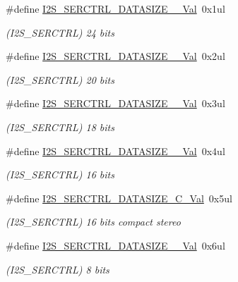 \begin{DoxyCompactItemize}
\#define \mbox{\hyperlink{group___s_a_m_d21___i2_s_ga8e42011d7f151e6e19ebdacf35bdfed1}{I2\+S\+\_\+\+S\+E\+R\+C\+T\+R\+L\+\_\+\+D\+A\+T\+A\+S\+I\+Z\+E\+\_\+\_\+\+Val}}~0x1ul
\begin{DoxyCompactList}\small\item\em (I2\+S\+\_\+\+S\+E\+R\+C\+T\+RL) 24 bits \end{DoxyCompactList}\item 
\#define \mbox{\hyperlink{group___s_a_m_d21___i2_s_ga0b83fc41259df61dc2a04cd386d4afcb}{I2\+S\+\_\+\+S\+E\+R\+C\+T\+R\+L\+\_\+\+D\+A\+T\+A\+S\+I\+Z\+E\+\_\+\_\+\+Val}}~0x2ul
\begin{DoxyCompactList}\small\item\em (I2\+S\+\_\+\+S\+E\+R\+C\+T\+RL) 20 bits \end{DoxyCompactList}\item 
\#define \mbox{\hyperlink{group___s_a_m_d21___i2_s_ga7ed3fda53f4e7cd66daf99de07f7b72c}{I2\+S\+\_\+\+S\+E\+R\+C\+T\+R\+L\+\_\+\+D\+A\+T\+A\+S\+I\+Z\+E\+\_\+\_\+\+Val}}~0x3ul
\begin{DoxyCompactList}\small\item\em (I2\+S\+\_\+\+S\+E\+R\+C\+T\+RL) 18 bits \end{DoxyCompactList}\item 
\#define \mbox{\hyperlink{group___s_a_m_d21___i2_s_ga29881b7370baf689e9b9bcca4852f196}{I2\+S\+\_\+\+S\+E\+R\+C\+T\+R\+L\+\_\+\+D\+A\+T\+A\+S\+I\+Z\+E\+\_\+\_\+\+Val}}~0x4ul
\begin{DoxyCompactList}\small\item\em (I2\+S\+\_\+\+S\+E\+R\+C\+T\+RL) 16 bits \end{DoxyCompactList}\item 
\#define \mbox{\hyperlink{group___s_a_m_d21___i2_s_ga5a12749b93456c42e1b3c0feb138c0a3}{I2\+S\+\_\+\+S\+E\+R\+C\+T\+R\+L\+\_\+\+D\+A\+T\+A\+S\+I\+Z\+E\+\_\+C\+\_\+\+Val}}~0x5ul
\begin{DoxyCompactList}\small\item\em (I2\+S\+\_\+\+S\+E\+R\+C\+T\+RL) 16 bits compact stereo \end{DoxyCompactList}\item 
\#define \mbox{\hyperlink{group___s_a_m_d21___i2_s_ga0572a17dda9f49332b4767c8db604d9d}{I2\+S\+\_\+\+S\+E\+R\+C\+T\+R\+L\+\_\+\+D\+A\+T\+A\+S\+I\+Z\+E\+\_\+\_\+\+Val}}~0x6ul
\begin{DoxyCompactList}\small\item\em (I2\+S\+\_\+\+S\+E\+R\+C\+T\+RL) 8 bits \end{DoxyCompactList}\item 

\end{DoxyCompactItemize}
